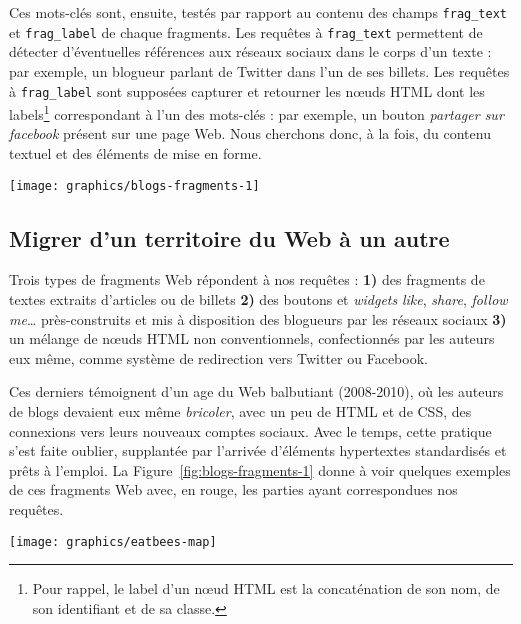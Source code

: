 \documentclass[symmetric,justified,marginals=raggedouter]{tufte-book}
\begin{document}
\noindent Ces mots-clés sont, ensuite, testés par rapport au contenu des champs \texttt{frag\_text} et \texttt{frag\_label} de chaque fragments. Les requêtes à \texttt{frag\_text} permettent de détecter d'éventuelles références aux réseaux sociaux dans le corps d'un texte : par exemple, un blogueur parlant de Twitter dans l'un de ses billets. Les requêtes à \texttt{frag\_label} sont supposées capturer et retourner les nœuds HTML dont les labels\footnote{\RaggedOuter Pour rappel, le label d'un nœud HTML est la concaténation de son nom, de son identifiant et de sa classe.} correspondant à l'un des mots-clés : par exemple, un bouton \textit{partager sur facebook} présent sur une page Web. Nous cherchons donc, à la fois, du contenu textuel et des éléments de mise en forme.

\begin{figure*}
  \texttt{[image: graphics/blogs-fragments-1]}
  \caption{Exemples de fragments Web associés à divers réseaux sociaux}
  \label{fig:blogs-fragments-1}
\end{figure*} 

\subsection{Migrer d'un territoire du Web à un autre}

\noindent Trois types de fragments Web répondent à nos requêtes : \textbf{1)} des fragments de textes extraits d'articles ou de billets \textbf{2)} des boutons et \textit{widgets} \textit{like}, \textit{share}, \textit{follow me}\ldots{} près-construits et mis à disposition des blogueurs par les réseaux sociaux \textbf{3)} un mélange de nœuds HTML non conventionnels, confectionnés par les auteurs eux même, comme système de redirection vers Twitter ou Facebook. 

Ces derniers témoignent d'un age du Web balbutiant (2008-2010), où les auteurs de blogs devaient eux même \textit{bricoler}, avec un peu de HTML et de CSS, des connexions vers leurs nouveaux comptes sociaux. Avec le temps, cette pratique s'est faite oublier, supplantée par l'arrivée d'éléments hypertextes standardisés et prêts à l'emploi. La Figure~\ref{fig:blogs-fragments-1} donne à voir quelques exemples de ces fragments Web avec, en rouge, les parties ayant correspondues nos requêtes. 

\begin{marginfigure}%
  \texttt{[image: graphics/eatbees-map]}
  \vspace*{0.2cm}  
  \caption{\textit{eatbess.com} (rouge) dans l'e-Diaspora marocaine}
  \label{fig:eatbees-map}
\end{marginfigure} 
\end{document}
